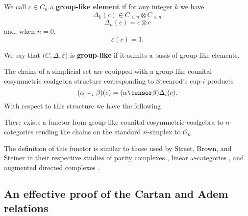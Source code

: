 We call $c \in C_n$ a \textbf{group-like element} if for any integer $k$ we have
\begin{equation*}
\Delta_k (c) \in C_{\leq n} \otimes C_{\leq n}
\end{equation*}
\begin{equation*}
\Delta_n(c) = c \otimes c
\end{equation*}
and, when $n = 0$,
\begin{equation*}
\varepsilon(c) = 1.
\end{equation*}

We say that $\big( C, \Delta , \varepsilon \big)$ is \textbf{group-like} if it admits a basis of group-like elements.

The chains of a simplicial set are equipped with a group-like counital cosymmetric coalgebra structure corresponding to Steenrod's cup-$i$ products
\begin{equation*}
(\alpha \smallsmile_{i} \beta)(c) = (\alpha \tensor \beta)\Delta_i(c).
\end{equation*}
With respect to this structure we have the following
\begin{theorem} 
	There exists a functor from group-like counital cosymmetric coalgebra to $n$-categories sending the chains on the standard $n$-simplex to $\mathcal O_n$.
\end{theorem}

The definition of this functor is similar to those used by Street, Brown, and Steiner in their respective studies of parity complexes \cite{street1991parity}, linear $\omega$-categories \cite{brown2003cubical}, and augmented directed complexes \cite{steiner2004omega}.

\subsection{An effective proof of the Cartan and Adem relations}

